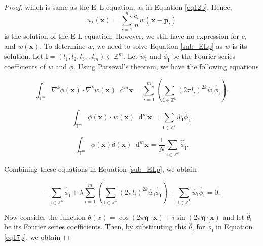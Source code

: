 \documentclass[multixcb]{amstext-l}
\theoremstyle{plain}
\theoremstyle{definition}
\theoremstyle{definition}
\theoremstyle{remark}
\numberwithin{equation}{chapter}
\begin{document}
\begin{appendix}
\begin{proof}
which is same as the E--L equation, as in Equation \ref{eq12b}. Hence, $$u_{\lambda}(\boldsymbol{x}) = \sum\limits_{i=1}^n \frac{c_i}{n}w(\boldsymbol{x}-\boldsymbol{p}_i)$$ is the solution of the E-L equation. However, we still have no expression for $c_i$ and $w(\boldsymbol{x})$. To determine $w$, we need to solve Equation \ref{sub_ELp} as $w$ is its solution. Let $\boldsymbol{l} = (l_1,l_2,l_3,..l_m)\in \mathbb{Z}^m$. Let $\hat{w}_{\boldsymbol{l}}$ and $\hat{\phi}_{\boldsymbol{l}}$ be the Fourier series coefficients of $w$ and $\phi$. Using Parseval's theorem, we have the following equations

\begin{equation}\label{eq14p}
\int_{\mathbb{T}^m}\nabla^k\phi(\boldsymbol{x})\cdot \nabla^k w(\boldsymbol{x}) \mathop{}\!\mathrm{d}^m\boldsymbol{x} = \sum\limits_{i = 1}^m( \sum\limits_{\boldsymbol{l} \in \mathbb{Z}^k}(2\pi l_i)^{2k}\hat{w}_{\boldsymbol{l}} \hat{\phi}_{\boldsymbol{l}}).
\end{equation}

\begin{equation}\label{eq15p}
\int_{\mathbb{T}^m}\phi(\boldsymbol{x})\cdot w(\boldsymbol{x}) \mathop{}\!\mathrm{d}^m\boldsymbol{x} = \sum\limits_{\boldsymbol{l} \in \mathbb{Z}^k}\hat{w}_{\boldsymbol{l}} \hat{\phi}_{\boldsymbol{l}}.
\end{equation}

\begin{equation}\label{eq16p}
    \int_{\mathbb{T}^m}\phi(\boldsymbol{x})\delta(\boldsymbol{x})\mathop{}\!\mathrm{d}^m\boldsymbol{x} = \frac{1}{N} \sum\limits_{\boldsymbol{l} \in \mathbb{Z}^k} \hat{\phi}_{\boldsymbol{l}}. 
\end{equation}

Combining these equations in Equation \ref{sub_ELp}, we obtain 

\begin{equation}\label{eq17p}
     -\sum\limits_{\boldsymbol{l} \in \mathbb{Z}^k} \hat{\phi}_{\boldsymbol{l}} + \lambda\sum\limits_{i = 1}^m( \sum\limits_{\boldsymbol{l} \in \mathbb{Z}^k}(2\pi l_i)^{2k}\hat{w}_{\boldsymbol{l}} \hat{\phi}_{\boldsymbol{l}}) + \sum\limits_{\boldsymbol{l} \in \mathbb{Z}^k}\hat{w}_{\boldsymbol{l}} \hat{\phi}_{\boldsymbol{l}} = 0 .
\end{equation}

Now consider the function $\theta(x) = \cos{(2\pi\boldsymbol{\eta}\cdot\boldsymbol{x})} + i\sin{(2\pi\boldsymbol{\eta}\cdot\boldsymbol{x})}$ and let $\hat{\theta}_{\boldsymbol{l}}$ be its Fourier series coefficients. Then, by substituting this $\hat{\theta}_{\boldsymbol{l}}$ for $\hat{\phi}_{\boldsymbol{l}}$ in Equation \ref{eq17p}, we obtain 


\end{proof}
\end{appendix}
\end{document}
